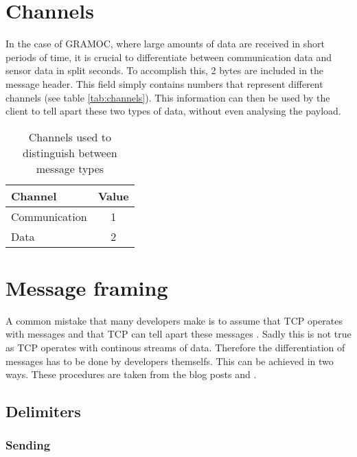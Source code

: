 \section{Channels}
\label{sec:channels}

In the case of GRAMOC, where large amounts of data are received in short periods of time, it is crucial to differentiate between communication data and sensor data in split seconds. To accomplish this, 2 bytes are included in the message header. This field simply contains numbers that represent different channels (see table \vref{tab:channels}). This information can then be used by the client to tell apart these two types of data, without even analysing the payload.

\begin{table}[h]
    \centering
    \begin{tabular}{| l | c |}
    \hline
    \textbf{Channel} & \textbf{Value} \\ \hline
    Communication & 1 \\ \hline
    Data & 2 \\
    \hline
    \end{tabular}
    \caption{Channels used to distinguish between message types}
    \label{tab:channels}
\end{table}

\section{Message framing}
\label{sec:messageframing}

A common mistake that many developers make is to assume that TCP operates with messages and that TCP can tell apart these messages \autocite{MessageFramingCleary} \autocite{MessageFramingSkotzko}. Sadly this is not true as TCP operates with continous streams of data. Therefore the differentiation of messages has to be done by developers themselfs. This can be achieved in two ways. These procedures are taken from the blog posts  and  \autocite{MessageFramingCleary} \autocite{MessageFramingSkotzko}.

\subsection{Delimiters}

\subsubsection{Sending}


